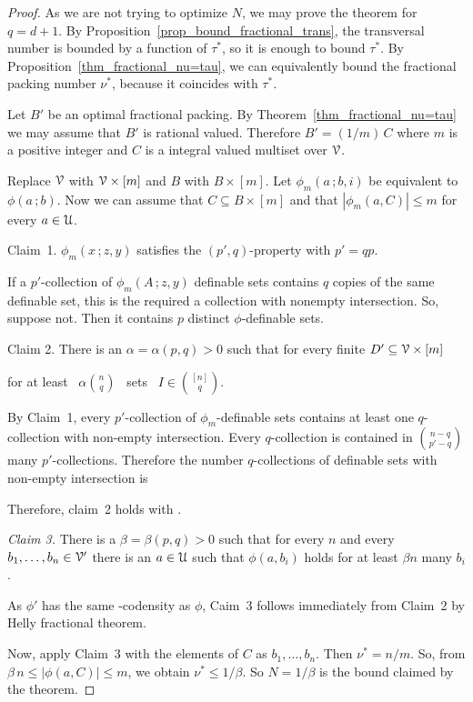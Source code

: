 \documentclass[scombinatorics.tex]{subfiles}
\begin{document}
\begin{proof}
As we are not trying to optimize $N$, we may prove the theorem for $q=d+1$.
By Proposition~\ref{prop_bound_fractional_trans}, the transversal number is bounded by a function of $\tau^*$, so it is enough to bound $\tau^*$. By Proposition~\ref{thm_fractional_nu=tau}, we can equivalently bound the fractional packing number $\nu^*$, because it coincides with $\tau^*$.

Let $B'$ be an optimal fractional packing. By Theorem~\ref{thm_fractional_nu=tau} we may assume that $B'$ is rational valued. Therefore $B'=(1/m)\,C$ where $m$ is a positive integer and $C$ is a integral valued multiset over $\EuScript V$.

Replace $\EuScript V$ with $\EuScript V\times[m]$ and $B$ with $B\times[m]$.
Let $\phi_m(a\,;b,i)$ be equivalent to $\phi(a\,;b)$.
Now we can assume that $C\subseteq B\times[m]$ and that $|\phi_m(a,C)|\le m$ for every $a\in\EuScript U$.

\smallskip
Claim~1. $\phi_m(x\,;z,y)$ satisfies the $(p',q)$-property with $p'=qp$.

If a $p'$-collection of $\phi_m(A\,;z,y)$ definable sets contains $q$ copies of the same definable set, this is the required a collection with nonempty intersection.
So, suppose not.
Then it contains $p$ distinct $\phi$-definable sets.

\smallskip
Claim 2.
There is an $\alpha=\alpha(p,q)>0$ such that for every finite $D'\subseteq\EuScript V\times[m]$

\hfill for at least \ $\displaystyle\alpha{n\choose q}$ \ sets \ $\displaystyle I\in{[n]\choose q}$.

By Claim~1, every $p'$-collection of $\phi_m$-definable sets contains at least one $q$-collection with non-empty intersection.
Every $q$-collection is contained in ${n-q\choose p'-q}$ many $p'$-collections.
Therefore the number $q$-collections of definable sets with non-empty intersection is


Therefore, claim~2 holds with .

\medskip
\textit{Claim 3.}
There is a $\beta=\beta(p,q)>0$ such that for every $n$ and every $b_1,\dots,b_n\in\EuScript V'$ there is an $a\in\EuScript U$ such that $\phi(a,b_i)$ holds for at least $\beta n$ many $b_i$.

As $\phi'$ has the same \vc-codensity as $\phi$,  Caim~3 follows immediately from Claim~2 by Helly fractional theorem.

Now, apply Claim~3 with the elements of $C$ as $b_1,\dots,b_n$. Then $\nu^*=n/m$. So, from $\beta\,n\le |\phi(a,C)|\le m$, we obtain  $\nu^*\le 1/\beta$. So $N=1/\beta$ is the bound claimed by the theorem.
\end{proof}
\end{document}
